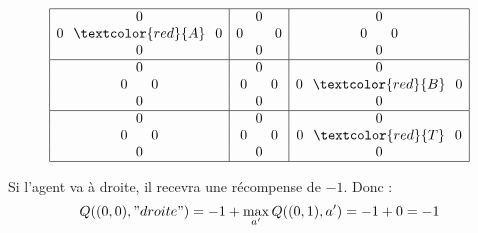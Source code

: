 \documentclass{beamer}
\begin{document}
\begin{frame}
\begin{figure}[!ht]
\centering
$$\begin{array}{|c|c|c|}
\hline
0                      & 0                           & 0 \\
0\hspace*{0.25cm}\textcolor{red}{A}\hspace*{0.25cm} 0 & 0\hspace*{0.8cm} 0                  & 0\hspace*{0.6cm}0 \\
0          & 0          & 0 \\
\hline
0          & 0                            & 0 \\
0\hspace*{0.6cm}0   & 0\hspace*{0.6cm} 0                  & 0\hspace*{0.25cm}\textcolor{red}{B}\hspace*{0.25cm} 0 \\
0           & 0          & 0 \\
\hline
0          & 0                         & 0\\
0\hspace*{0.6cm} 0                     & 0\hspace*{0.6cm}0                & 0\hspace*{0.25cm}\textcolor{red}{T}\hspace*{0.25cm} 0 \\
0                            & 0        & 0 \\
\hline
\end{array}
$$
\end{figure}
\end{frame}

\begin{frame}
Si l'agent va à droite, il recevra une récompense de $-1$. Donc : 
$$Q((0,0), "droite") = -1 + \max_{a'} Q((0,1), a') = -1+0 = -1$$
\end{frame}
\end{document}
